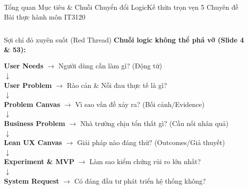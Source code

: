 \documentclass[aspectratio=169, 10pt]{beamer}
\begin{document}
\begin{frame}[t]{Tổng quan Mục tiêu \& Chuỗi Chuyển đổi Logic}{Kế thừa trọn vẹn 5 Chuyên đề Bài thực hành môn IT3120}
\begin{columns}[T]
      \begin{accentCard}{Sợi chỉ đỏ xuyên suốt (Red Thread)}
        \centering\scriptsize
        \textbf{Chuỗi logic không thể phá vỡ (Slide 4 \& 53):}\\[0.15cm]
        \begin{tcolorbox}[colback=white, colframe=NavyDark!40, arc=1mm, boxrule=0.4pt, left=2mm, right=2mm, top=1.5mm, bottom=1.5mm]
          \tiny
          \textbf{User Needs} $\to$ Người dùng cần làm gì? (Động từ)\\[0.05cm]
          $\downarrow$\\[0.05cm]
          \textbf{User Problem} $\to$ Rào cản \& Nỗi đau thực tế là gì?\\[0.05cm]
          $\downarrow$\\[0.05cm]
          \textbf{Problem Canvas} $\to$ Vì sao vấn đề xảy ra? (Bối cảnh/Evidence)\\[0.05cm]
          $\downarrow$\\[0.05cm]
          \textbf{Business Problem} $\to$ Nhà trường chịu tổn thất gì? (Cầu nối nhân quả)\\[0.05cm]
          $\downarrow$\\[0.05cm]
          \textbf{Lean UX Canvas} $\to$ Giải pháp nào đáng thử? (Outcomes/Giả thuyết)\\[0.05cm]
          $\downarrow$\\[0.05cm]
          \textbf{Experiment \& MVP} $\to$ Làm sao kiểm chứng rủi ro lớn nhất?\\[0.05cm]
          $\downarrow$\\[0.05cm]
          \textbf{System Request} $\to$ Có đáng đầu tư phát triển hệ thống không?
        \end{tcolorbox}
      \end{accentCard}
  \end{columns}
\end{frame}
\end{document}
